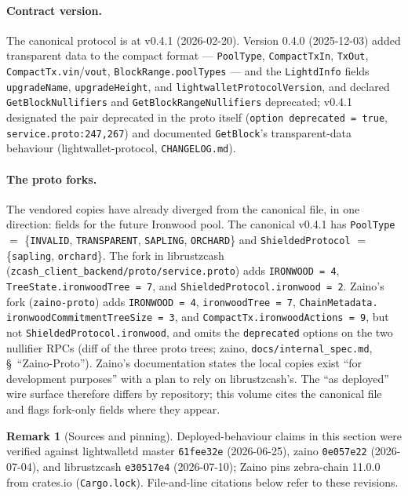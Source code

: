 \documentclass[11pt,a4paper]{article}
\theoremstyle{definition}
\newtheorem{remark}[theorem]{Remark}
\begin{document}
\paragraph{Contract version.} The canonical protocol is at v0.4.1
(2026-02-20). Version 0.4.0 (2025-12-03) added transparent data to the
compact format --- \texttt{PoolType}, \texttt{CompactTxIn}, \texttt{TxOut},
\texttt{CompactTx.vin}/\texttt{vout}, \texttt{BlockRange.poolTypes} --- and
the \texttt{LightdInfo} fields \texttt{upgradeName},
\texttt{upgradeHeight}, and \texttt{lightwalletProtocolVersion}, and
declared \texttt{GetBlockNullifiers} and
\texttt{GetBlockRangeNullifiers} deprecated; v0.4.1 designated the pair
deprecated in the proto itself (\texttt{option deprecated = true},
\texttt{service.proto:247,267}) and documented \texttt{GetBlock}'s
transparent-data behaviour (\textsf{lightwallet-protocol},
\texttt{CHANGELOG.md}).

\paragraph{The proto forks.} The vendored copies have already diverged
from the canonical file, in one direction: fields for the future Ironwood
pool. The canonical v0.4.1 has \texttt{PoolType} $=$ \{\texttt{INVALID},
\texttt{TRANSPARENT}, \texttt{SAPLING}, \texttt{ORCHARD}\} and
\texttt{ShieldedProtocol} $=$ \{\texttt{sapling}, \texttt{orchard}\}.
The fork in \textsf{librustzcash}
(\texttt{zcash\_client\_backend/proto/service.proto}) adds
\texttt{IRONWOOD = 4}, \texttt{TreeState.ironwoodTree = 7}, and
\texttt{ShieldedProtocol.ironwood = 2}. Zaino's fork
(\texttt{zaino-proto}) adds \texttt{IRONWOOD = 4},
\texttt{ironwoodTree = 7}, \texttt{ChainMetadata.\allowbreak
ironwoodCommitmentTreeSize = 3}, and \texttt{CompactTx.ironwoodActions =
9}, but not \texttt{ShieldedProtocol.ironwood}, and omits the
\texttt{deprecated} options on the two nullifier RPCs (diff of the three
proto trees; \textsf{zaino}, \texttt{docs/internal\_spec.md},
\S~``Zaino-Proto''). Zaino's documentation states the local copies exist
``for development purposes'' with a plan to rely on librustzcash's. The
``as deployed'' wire surface therefore differs by repository; this volume
cites the canonical file and flags fork-only fields where they appear.

\begin{remark}[Sources and pinning]\label{rem:sync-pins}
Deployed-behaviour claims in this section were verified against
\textsf{lightwalletd} master \texttt{61fee32e} (2026-06-25),
\textsf{zaino} \texttt{0e057e22} (2026-07-04), and \textsf{librustzcash}
\texttt{e30517e4} (2026-07-10); Zaino pins \textsf{zebra-chain} 11.0.0
from crates.io (\texttt{Cargo.lock}). File-and-line citations below refer
to these revisions.
\end{remark}
\end{document}
